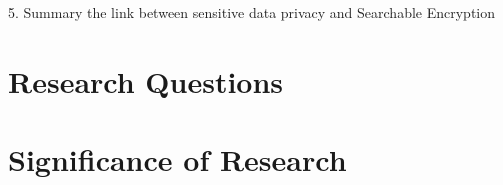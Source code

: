 5. Summary the link between sensitive data privacy and Searchable Encryption 

\section{Research Questions}

\section{Significance of Research}